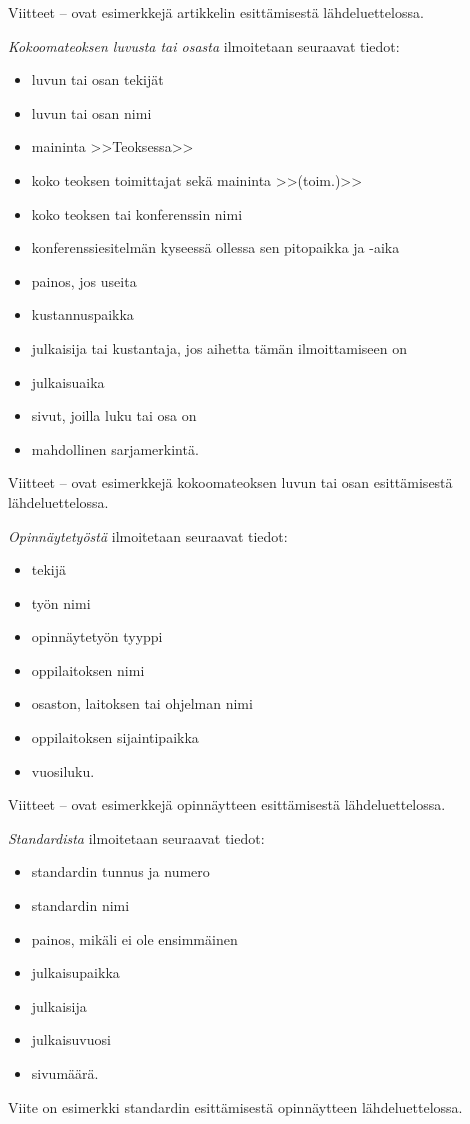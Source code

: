 \documentclass[english,12pt,a4paper,pdftex,sci,utf8]{aaltothesis}
\begin{document}
Viitteet \cite{bcs}--\cite{Deschamps} ovat esimerkkej\"a artikkelin
esitt\"amisest\"a l\"ahdeluettelossa.

\textit{Kokoomateoksen luvusta tai osasta} ilmoitetaan seuraavat tiedot:

\begin{itemize}
\item[--]luvun tai osan tekij\"at
\item[--]luvun tai osan nimi
\item[--]maininta >>Teoksessa>>
\item[--]koko teoksen toimittajat sek\"a maininta >>(toim.)>>
\item[--]koko teoksen tai konferenssin nimi
\item[--]konferenssiesitelm\"an kyseess\"a ollessa sen pitopaikka ja -aika
\item[--]painos, jos useita
\item[--]kustannuspaikka
\item[--]julkaisija tai kustantaja, jos aihetta t\"am\"an ilmoittamiseen on
\item[--]julkaisuaika
\item[--]sivut, joilla luku tai osa on 
\item[--]mahdollinen sarjamerkint\"a.
\end{itemize}

Viitteet \cite{Sihvola}--\cite{Lindblom} ovat esimerkkej\"a
kokoomateoksen luvun tai osan esitt\"amisest\"a l\"ahdeluettelossa. 

\textit{Opinn\"aytety\"ost\"a} ilmoitetaan seuraavat tiedot:

\begin{itemize}
\item[--]tekij\"a
\item[--]ty\"on nimi
\item[--]opinn\"aytety\"on tyyppi
\item[--]oppilaitoksen nimi
\item[--]osaston, laitoksen tai ohjelman nimi
\item[--]oppilaitoksen sijaintipaikka
\item[--]vuosiluku.
\end{itemize}

Viitteet \cite{Miinusmaa}--\cite{Lonnqvist} ovat esimerkkej\"a
opinn\"aytteen esitt\"amisest\"a l\"ahdeluettelossa. 

\textit{Standardista} ilmoitetaan seuraavat tiedot:

\begin{itemize}
\item[--]standardin tunnus ja numero
\item[--]standardin nimi
\item[--]painos, mik\"ali ei ole ensimm\"ainen
\item[--]julkaisupaikka
\item[--]julkaisija
\item[--]julkaisuvuosi
\item[--]sivum\"a\"ar\"a.
\end{itemize}
Viite \cite{sfs} on esimerkki standardin esitt\"amisest\"a opinn\"aytteen
l\"ahdeluettelossa. 
\end{document}

